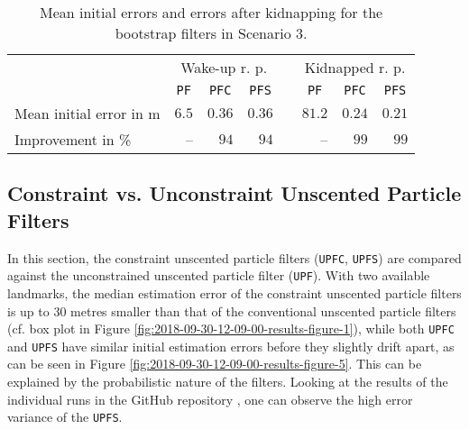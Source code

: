 \begin{table*}\centering
{}
\begin{tabular}{@{}lrrrrrrr@{}}\toprule
& \multicolumn{3}{c}{Wake-up r. p.} & \phantom{a} & \multicolumn{3}{c}{Kidnapped r. p.} \\ 
\cmidrule{2-4} \cmidrule{6-8}
 & \multicolumn{1}{c}{\texttt{PF}} & \multicolumn{1}{c}{\texttt{PFC}} & \multicolumn{1}{c}{\texttt{PFS}} & & \multicolumn{1}{c}{\texttt{PF}} & \multicolumn{1}{c}{\texttt{PFC}} & \multicolumn{1}{c}{\texttt{PFS}} \\
\midrule 
Mean initial error in m & $6.5$ & $0.36$ & $0.36$ & & $81.2$ & $0.24$ & $0.21$ \\              
Improvement in \%  & -- & $94$ & $94$ & & -- & $99$ & $99$ \\ 
\bottomrule
\end{tabular}
\caption{Mean initial errors and errors after kidnapping for the bootstrap filters in Scenario 3.}
\label{tab:mean_scenario3}
\end{table*}


\subsection[Unscented Particle Filters]{Constraint vs. Unconstraint Unscented Particle Filters}

In this section, the constraint unscented particle filters (\texttt{UPFC}, \texttt{UPFS}) are compared against the unconstrained unscented particle filter (\texttt{UPF}). With two available landmarks, the median estimation error of the constraint unscented particle filters is up to 30 metres smaller than that of the conventional unscented particle filters (cf. box plot in Figure \ref{fig:2018-09-30-12-09-00-results-figure-1}), while both \texttt{UPFC} and \texttt{UPFS} have similar initial estimation errors before they slightly drift apart, as can be seen in Figure \ref{fig:2018-09-30-12-09-00-results-figure-5}. This can be explained by the probabilistic nature of the filters. Looking at the results of the individual runs in the GitHub repository \cite{codeGithub}, one can observe the high error variance of the \texttt{UPFS}.

